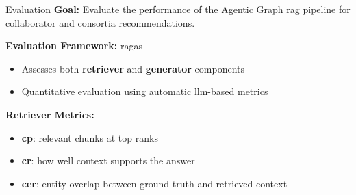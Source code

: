 \begin{tframe}{Evaluation}
\textbf{Goal:} Evaluate the performance of the Agentic Graph \gls{rag} pipeline for collaborator and consortia recommendations.

\vspace{0.5em}

    \textbf{Evaluation Framework:} \gls{ragas}~\cite{ragas2024}
    \begin{itemize}
    \item Assesses both \textbf{retriever} and \textbf{generator} components
    \item Quantitative evaluation using automatic \gls{llm}-based metrics
    \end{itemize}

    \vspace{0.5em}

    \textbf{Retriever Metrics:}
    \begin{itemize}
    \item \textbf{\gls{cp}}: relevant chunks at top ranks
    \item \textbf{\gls{cr}}: how well context supports the answer
    \item \textbf{\gls{cer}}: entity overlap between ground truth and retrieved context
    \end{itemize}
\end{tframe}